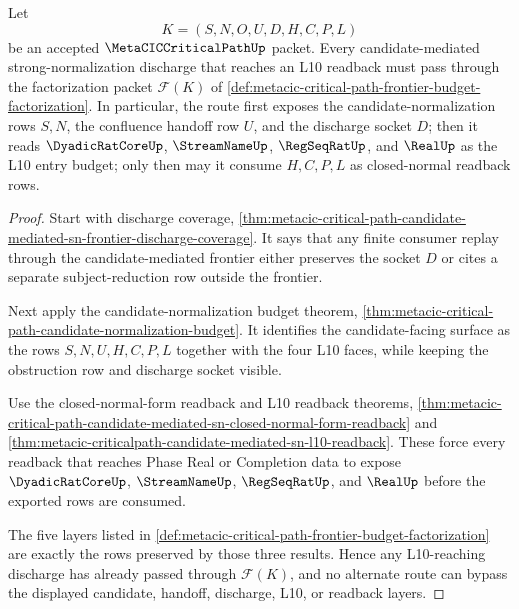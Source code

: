 \begin{theorem}
\label{thm:metacic-critical-path-candidate-frontier-l10-budget-lock}
Let
$$
K=(S,N,O,U,D,H,C,P,L)
$$
be an accepted $\MetaCICCriticalPathUp$ packet. Every candidate-mediated strong-normalization discharge that reaches an L10 readback must pass through the factorization packet $\mathcal{F}(K)$ of \autoref{def:metacic-critical-path-frontier-budget-factorization}. In particular, the route first exposes the candidate-normalization rows $S,N$, the confluence handoff row $U$, and the discharge socket $D$; then it reads $\DyadicRatCoreUp$, $\StreamNameUp$, $\RegSeqRatUp$, and $\RealUp$ as the L10 entry budget; only then may it consume $H,C,P,L$ as closed-normal readback rows.
\end{theorem}
\begin{proof}
Start with discharge coverage, \autoref{thm:metacic-critical-path-candidate-mediated-sn-frontier-discharge-coverage}. It says that any finite consumer replay through the candidate-mediated frontier either preserves the socket $D$ or cites a separate subject-reduction row outside the frontier.

Next apply the candidate-normalization budget theorem, \autoref{thm:metacic-critical-path-candidate-normalization-budget}. It identifies the candidate-facing surface as the rows $S,N,U,H,C,P,L$ together with the four L10 faces, while keeping the obstruction row and discharge socket visible.

Use the closed-normal-form readback and L10 readback theorems, \autoref{thm:metacic-critical-path-candidate-mediated-sn-closed-normal-form-readback} and \autoref{thm:metacic-criticalpath-candidate-mediated-sn-l10-readback}. These force every readback that reaches Phase Real or Completion data to expose $\DyadicRatCoreUp$, $\StreamNameUp$, $\RegSeqRatUp$, and $\RealUp$ before the exported rows are consumed.

The five layers listed in \autoref{def:metacic-critical-path-frontier-budget-factorization} are exactly the rows preserved by those three results. Hence any L10-reaching discharge has already passed through $\mathcal{F}(K)$, and no alternate route can bypass the displayed candidate, handoff, discharge, L10, or readback layers.
\end{proof}

